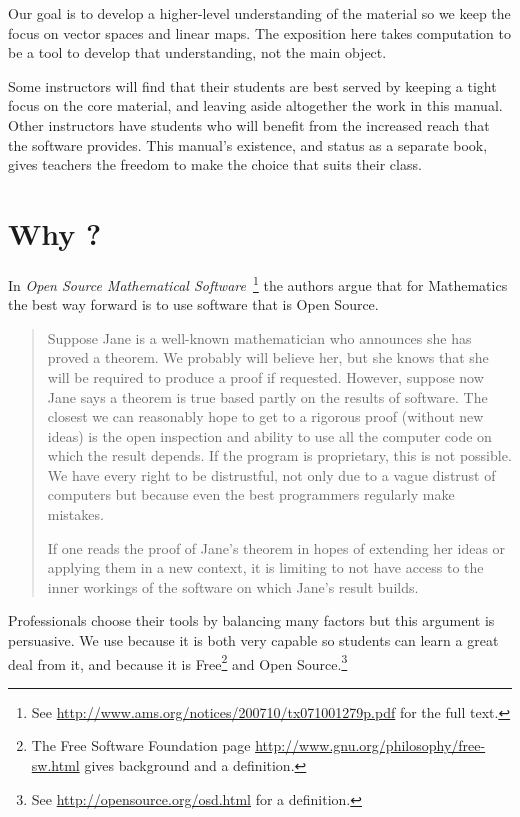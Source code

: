 Our goal is to 
develop a higher-level understanding of the material so we 
keep the focus on vector spaces and linear maps.
The exposition here takes computation to be
a tool to develop that understanding, not the main object.

Some instructors will find 
that their students are best served by
keeping a tight focus on the
core material, and leaving aside altogether 
the work in this manual. 
Other instructors
have students who will benefit from the increased reach that the software
provides.
This manual's existence, and status as a separate book, gives teachers the 
freedom to make the choice that suits their class.


\section{Why \Sage?}
In 
\textit{Open Source Mathematical Software\,} \citep{JoynerStein07}\footnote{See 
\protect\url{http://www.ams.org/notices/200710/tx071001279p.pdf} for the 
full text.}
the authors argue that for Mathematics the best way forward
is to use software that is Open Source.

\begin{quotation}\small
Suppose Jane is a well-known mathematician who announces
she has proved a theorem. We probably will believe
her, but she knows that she will be required to produce
a proof if requested. However, suppose now Jane says a
theorem is true based partly on the results of software. The
closest we can reasonably hope to get to a rigorous proof
(without new ideas) is the open inspection and ability to use
all the computer code on which the result depends. If the
program is proprietary, this is not possible. We have every
right to be distrustful, not only due to a vague distrust of
computers but because even the best programmers regularly
make mistakes.

If one reads the proof of Jane’s theorem in hopes of
extending her ideas or applying them in a new context, it
is limiting to not have access to the inner workings of the
software on which Jane’s result builds.
\end{quotation}  
Professionals choose their tools by balancing many factors but
this argument is persuasive.
We use \Sage{} because it is both very capable 
so students can 
learn a great deal from it,
and because it is 
Free\footnote{The Free Software Foundation page 
\protect\url{http://www.gnu.org/philosophy/free-sw.html} 
gives background and a definition.} 
and Open Source.\footnote{See \protect\url{http://opensource.org/osd.html} 
for a definition.} 



